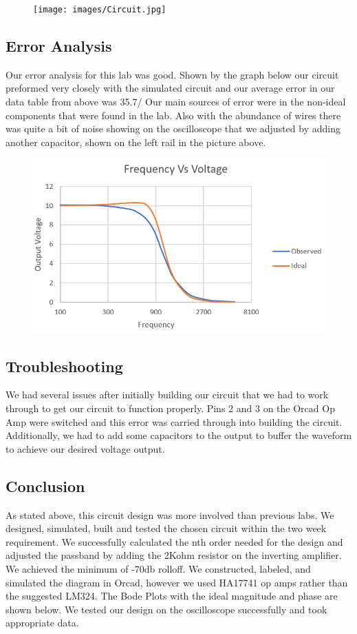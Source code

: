 \documentclass[11pt]{article}
\begin{document}
\begin{figure}[H]
	    \centering
	    \texttt{[image: images/Circuit.jpg]}
	 \end{figure}
	 \newpage
	\subsection*{Error Analysis}
	Our error analysis for this lab was good. Shown by the graph below our circuit preformed very closely with the simulated circuit and our average error in our data table from above was 35.7/%
	Our main sources of error were in the non-ideal components that were found in the lab. Also with the abundance of wires there was quite a bit of noise showing on the oscilloscope that we adjusted by adding another capacitor, shown on the left rail in the picture above. 			
	\begin{figure}[H]
		\centering
		\includegraphics[width=5.5in]{images/comparison_graph.PNG}
	\end{figure}
\subsection*{Troubleshooting}
	We had several issues after initially building our circuit that we had to work through to get our circuit to function properly. Pins 2 and 3 on the Orcad Op Amp were switched and this error was carried through into building the circuit. Additionally, we had to add some capacitors to the output to buffer the waveform to achieve our desired voltage output. 
\subsection*{Conclusion}
	As stated above, this circuit design was more involved than previous labs. We designed, simulated, built and tested the chosen circuit within the two week requirement. We successfully calculated the nth order needed for the design and adjusted the passband by adding the 2Kohm resistor on the inverting amplifier. We achieved the minimum of -70db rolloff. We constructed, labeled, and simulated the diagram in Orcad, however we used HA17741 op amps rather than the suggested LM324. The Bode Plots with the ideal magnitude and phase are shown below. We tested our design on the oscilloscope successfully and took appropriate data.
\newpage
\end{document}
